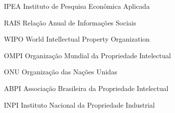 %
%

\listoffigures*
\cleardoublepage

%
%

\listofquadros*
\cleardoublepage

%
%

\begin{siglas}
	\setlength{\baselineskip}{0.7\baselineskip}
	
	\item[IPEA] Instituto de Pesquisa Econômica Aplicada
	\item[RAIS] Relação Anual de Informações Sociais
	\item[WIPO] World Intellectual Property Organization
	\item[OMPI] Organização Mundial da Propriedade Intelectual
	\item[ONU] Organização das Nações Unidas
	\item[ABPI] Associação Brasileira da Propriedade Intelectual
	\item[INPI] Instituto Nacional da Propriedade Industrial 
\end{siglas}

%
%

\listoftables*
\cleardoublepage
